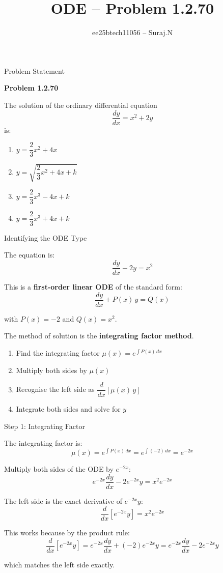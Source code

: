\documentclass{beamer}
\title{ODE -- Problem 1.2.70}
\author{ee25btech11056 -- Suraj.N}
\numberwithin{equation}{section}
\theoremstyle{remark}
\begin{document}
\begin{frame}
  \titlepage
\end{frame}

\begin{frame}{Problem Statement}

\textbf{Problem 1.2.70}

The solution of the ordinary differential equation
\[
  \frac{dy}{dx} = x^2 + 2y
\]
is:

\begin{enumerate}
  \item $y = \dfrac{2}{3}x^2 + 4x$
  \item $y = \sqrt{\dfrac{2}{3}x^2 + 4x + k}$
  \item $y = \dfrac{2}{3}x^3 - 4x + k$
  \item $y = \dfrac{2}{3}x^3 + 4x + k$
\end{enumerate}

\end{frame}

\begin{frame}{Identifying the ODE Type}

The equation is:
\[
  \frac{dy}{dx} - 2y = x^2
\]

This is a \textbf{first-order linear ODE} of the standard form:
\[
  \frac{dy}{dx} + P(x)\,y = Q(x)
\]

with $P(x) = -2$ and $Q(x) = x^2$.

The method of solution is the \textbf{integrating factor method}.

\begin{enumerate}
  \item Find the integrating factor $\mu(x) = e^{\int P(x)\,dx}$
  \item Multiply both sides by $\mu(x)$
  \item Recognise the left side as $\dfrac{d}{dx}[\mu(x)\,y]$
  \item Integrate both sides and solve for $y$
\end{enumerate}

\end{frame}

\begin{frame}{Step 1: Integrating Factor}

The integrating factor is:
\[
  \mu(x) = e^{\int P(x)\,dx} = e^{\int (-2)\,dx} = e^{-2x}
\]

Multiply both sides of the ODE by $e^{-2x}$:
\[
  e^{-2x}\frac{dy}{dx} - 2e^{-2x}y = x^2 e^{-2x}
\]

The left side is the exact derivative of $e^{-2x}y$:
\[
  \frac{d}{dx}\!\left[e^{-2x}y\right] = x^2 e^{-2x}
\]

This works because by the product rule:
\[
  \frac{d}{dx}\!\left[e^{-2x}y\right]
  = e^{-2x}\frac{dy}{dx} + (-2)e^{-2x}y
  = e^{-2x}\frac{dy}{dx} - 2e^{-2x}y
\]

which matches the left side exactly.

\end{frame}
\end{document}
